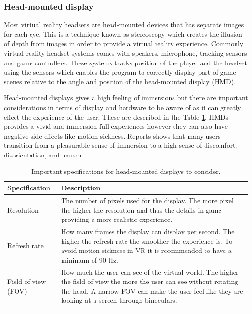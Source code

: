 \subsubsection{Head-mounted display}
Most virtual reality headsets are head-mounted devices that has separate images for each eye. This is a technique known as stereoscopy which creates the illusion of depth from images in order to provide a virtual reality experience. Commonly virtual reality headset systems comes with speakers, microphone, tracking sensors and game controllers. These systems tracks position of the player and the headset using the sensors which enables the program to correctly display part of game scenes relative to the angle and position of the head-mounted display (HMD).

Head-mounted displays gives a high feeling of immersions but there are important considerations in terms of display and hardware to be aware of as it can greatly effect the experience of the user. These are described in the Table \ref{table:hmdSpecs}. HMDs provides a vivid and immersion full experiences however they can also have negative side effects like motion sickness. Reports shows that many users transition from a pleasurable sense of immersion to a high sense of discomfort, disorientation, and nausea \cite{munafo2017virtual}. 

\begin{table}[!ht]
      \centering
      \caption{Important specifications for head-mounted displays to consider.}
        \begin{tabularx}{\textwidth}{l X}
        \toprule
       Specification & Description                                                                           
       \\ 
       \midrule
       \vspace{0.2cm}
        Resolution & The number of pixels used for the display. The more pixel the higher the resolution and thus the details in game providing a more realistic experience.                                   
        \\
        \vspace{0.2cm}
        Refresh rate & How many frames the display can display per second. The higher the refresh rate the smoother the experience is. To avoid motion sickness in VR it is recommended to have a minimum of 90 Hz. 
        \\
        \vspace{0.2cm}
        Field of view (FOV) & How much the user can see of the virtual world. The higher the field of view the more the user can see without rotating the head. A narrow FOV can make the user feel like they are looking at a screen through binoculars.
        \\
        \bottomrule
        \label{table:hmdSpecs}
        \end{tabularx}
\end{table}


